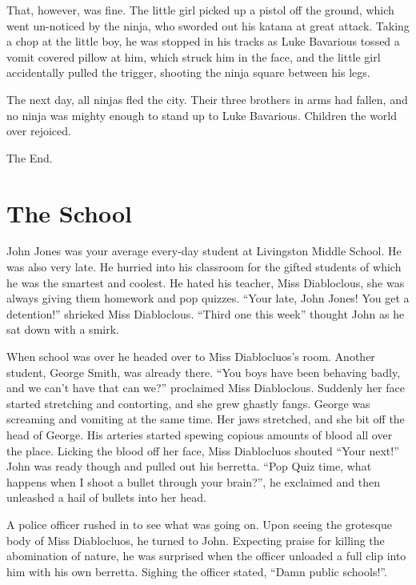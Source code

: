 That, however, was fine. The little girl picked up a pistol off the
ground, which went un-noticed by the ninja, who sworded out his
katana at great attack. Taking a chop at the little boy, he was
stopped in his tracks as Luke Bavarious tossed a vomit covered
pillow at him, which struck him in the face, and the little girl
accidentally pulled the trigger, shooting the ninja square between
his legs.



The next day, all ninjas fled the city. Their three brothers in
arms had fallen, and no ninja was mighty enough to stand up to Luke
Bavarious. Children the world over rejoiced.



The End. 
 



\chapter{The School}


John Jones was your average every-day student at Livingston Middle
School. He was also very late. He hurried into his classroom for
the gifted students of which he was the smartest and coolest. He
hated his teacher, Miss Diabloclous, she was always giving them
homework and pop quizzes. ``Your late, John Jones! You get a
detention!'' shrieked Miss Diabloclous. ``Third one this
week'' thought John as he sat down with a smirk.



When school was over he headed over to Miss Diablocluos's
room. Another student, George Smith, was already there. ``You
boys have been behaving badly, and we can't have that can
we?'' proclaimed Miss Diabloclous. Suddenly her face started
stretching and contorting, and she grew ghastly fangs. George was
screaming and vomiting at the same time. Her jaws stretched, and
she bit off the head of George. His arteries started spewing
copious amounts of blood all over the place. Licking the blood off
her face, Miss Diablocluos shouted ``Your next!'' John
was ready though and pulled out his berretta. ``Pop Quiz time,
what happens when I shoot a bullet through your brain?'', he
exclaimed and then unleashed a hail of bullets into her head.



A police officer rushed in to see what was going on. Upon seeing
the grotesque body of Miss Diablocluos, he turned to John.
Expecting praise for killing the abomination of nature, he was
surprised when the officer unloaded a full clip into him with his
own berretta. Sighing the officer stated, ``Damn public
schools!''. 
 



